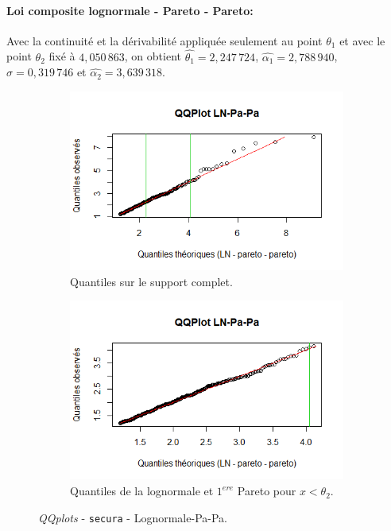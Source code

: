 		\paragraph{Loi composite lognormale - Pareto - Pareto:} Avec la continuité et la dérivabilité appliquée seulement au point $\theta_1$ et avec le point $\theta_2$ fixé à $4,050\,863$, on obtient $\hat{\theta_1} =2,247\,724 $, $\hat{\alpha_1} = 2,788\,940$, $\hat{\sigma}= 0,319\,746$ et $\hat{\alpha_2}=3,639\,318$.
		
		\begin{figure}[H]
			\begin{center}
				\begin{subfigure}[b]{0.45\textwidth}
					\includegraphics[scale=0.65]{Graphiques/QQ_LN_Pa_Pa_semi_Secura} 
					\caption{Quantiles sur le support complet.} \label{QQplot_LN_PaPa_semi_Sec}
				\end{subfigure}
				\begin{subfigure}[b]{0.4\textwidth}
					\includegraphics[scale=0.65]{Graphiques/QQ_LN_Pa_Pa_semi_t1_Secura} 
					\caption{Quantiles de la lognormale et $1^{ere}$ Pareto pour $x<\theta_2$.} \label{QQplot_LN_PaPa_semi_t1_sec}
				\end{subfigure}
				\renewcommand{\figurename}{Illustration}
				\caption{\textit{QQplots} - \texttt{secura} - Lognormale-Pa-Pa.}
			\end{center}
		\end{figure}
